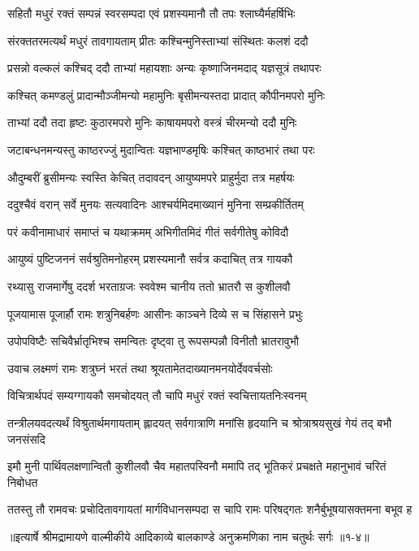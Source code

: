 \twolineshloka
{सहितौ मधुरं रक्तं सम्पन्नं स्वरसम्पदा}
{एवं प्रशस्यमानौ तौ तपः श्लाघ्यैर्महर्षिभिः} %

\twolineshloka
{संरक्ततरमत्यर्थं मधुरं तावगायताम्}
{प्रीतः कश्चिन्मुनिस्ताभ्यां संस्थितः कलशं ददौ} %

\twolineshloka
{प्रसन्नो वल्कलं कश्चिद् ददौ ताभ्यां महायशाः}
{अन्यः कृष्णाजिनमदाद् यज्ञसूत्रं तथापरः} %

\twolineshloka
{कश्चित् कमण्डलुं प्रादान्मौञ्जीमन्यो महामुनिः}
{बृसीमन्यस्तदा प्रादात् कौपीनमपरो मुनिः} %

\twolineshloka
{ताभ्यां ददौ तदा हृष्टः कुठारमपरो मुनिः}
{काषायमपरो वस्त्रं चीरमन्यो ददौ मुनिः} %

\twolineshloka
{जटाबन्धनमन्यस्तु काष्ठरज्जुं मुदान्वितः}
{यज्ञभाण्डमृषिः कश्चित् काष्ठभारं तथा परः} %

\twolineshloka
{औदुम्बरीं ब्रुसीमन्यः स्वस्ति केचित् तदावदन्}
{आयुष्यमपरे प्राहुर्मुदा तत्र महर्षयः} %

\twolineshloka
{ददुश्चैवं वरान् सर्वे मुनयः सत्यवादिनः}
{आश्चर्यमिदमाख्यानं मुनिना सम्प्रकीर्तितम्} %

\twolineshloka
{परं कवीनामाधारं समाप्तं च यथाक्रमम्}
{अभिगीतमिदं गीतं सर्वगीतेषु कोविदौ} %

\twolineshloka
{आयुष्यं पुष्टिजननं सर्वश्रुतिमनोहरम्}
{प्रशस्यमानौ सर्वत्र कदाचित् तत्र गायकौ} %

\twolineshloka
{रथ्यासु राजमार्गेषु ददर्श भरताग्रजः}
{स्ववेश्म चानीय ततो भ्रातरौ स कुशीलवौ} %

\twolineshloka
{पूजयामास पूजार्हौ रामः शत्रुनिबर्हणः}
{आसीनः काञ्चने दिव्ये स च सिंहासने प्रभुः} %

\twolineshloka
{उपोपविष्टैः सचिवैर्भ्रातृभिश्च समन्वितः}
{दृष्ट्वा तु रूपसम्पन्नौ विनीतौ भ्रातरावुभौ} %

\twolineshloka
{उवाच लक्ष्मणं रामः शत्रुघ्नं भरतं तथा}
{श्रूयतामेतदाख्यानमनयोर्देववर्चसोः} %

\twolineshloka
{विचित्रार्थपदं सम्यग्गायकौ समचोदयत्}
{तौ चापि मधुरं रक्तं स्वचित्तायतनिःस्वनम्} %

\threelineshloka
{तन्त्रीलयवदत्यर्थं विश्रुतार्थमगायताम्}
{ह्लादयत् सर्वगात्राणि मनांसि हृदयानि च}
{श्रोत्राश्रयसुखं गेयं तद् बभौ जनसंसदि} %

\fourlineindentedshloka
{इमौ मुनी पार्थिवलक्षणान्वितौ}
{कुशीलवौ चैव महातपस्विनौ}
{ममापि तद् भूतिकरं प्रचक्षते}
{महानुभावं चरितं निबोधत} %

\twolineshloka
{ततस्तु तौ रामवचः प्रचोदितावगायतां मार्गविधानसम्पदा}
{स चापि रामः परिषद्गतः शनैर्बुभूषयासक्तमना बभूव ह} %


॥इत्यार्षे श्रीमद्रामायणे वाल्मीकीये आदिकाव्ये बालकाण्डे अनुक्रमणिका नाम चतुर्थः सर्गः ॥१-४॥
